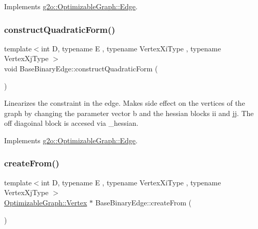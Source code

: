 Implements \mbox{\hyperlink{classg2o_1_1_optimizable_graph_1_1_edge_a414c69ca1617a4d3b620e39f2ffbcea7}{g2o\+::\+Optimizable\+Graph\+::\+Edge}}.

\mbox{\label{classg2o_1_1_base_binary_edge_a06a18745d95017c6d3c841f838a65364}} 
\subsubsection{\texorpdfstring{construct\+Quadratic\+Form()}{constructQuadraticForm()}}
{\footnotesize\ttfamily template$<$int D, typename E , typename Vertex\+Xi\+Type , typename Vertex\+Xj\+Type $>$ \\
void Base\+Binary\+Edge\+::construct\+Quadratic\+Form (\begin{DoxyParamCaption}{ }\end{DoxyParamCaption})\hspace{0.3cm}{\ttfamily [virtual]}}

Linearizes the constraint in the edge. Makes side effect on the vertices of the graph by changing the parameter vector b and the hessian blocks ii and jj. The off diagoinal block is accesed via \+\_\+hessian. 

Implements \mbox{\hyperlink{classg2o_1_1_optimizable_graph_1_1_edge_a56fbf3430ddf591e3c619bdd1b7e4499}{g2o\+::\+Optimizable\+Graph\+::\+Edge}}.

\mbox{\label{classg2o_1_1_base_binary_edge_a32bfc93b6dede619c7d99db2fb60f80d}} 
\subsubsection{\texorpdfstring{create\+From()}{createFrom()}}
{\footnotesize\ttfamily template$<$int D, typename E , typename Vertex\+Xi\+Type , typename Vertex\+Xj\+Type $>$ \\
\mbox{\hyperlink{classg2o_1_1_optimizable_graph_1_1_vertex}{Optimizable\+Graph\+::\+Vertex}} $\ast$ Base\+Binary\+Edge\+::create\+From (\begin{DoxyParamCaption}{ }\end{DoxyParamCaption})\hspace{0.3cm}{\ttfamily [virtual]}}



